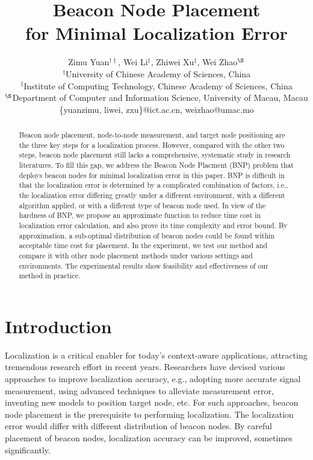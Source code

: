 \documentclass[10pt, conference, letterpaper]{IEEEtran}
\begin{document}
\title{Beacon Node Placement \\ for Minimal Localization Error}

\author{Zimu Yuan$^{\dagger\ddagger}$, Wei Li$^\ddagger$, Zhiwei Xu$^\ddagger$, Wei Zhao$^\S$ \\ $^{\dagger}$University of Chinese Academy of Sciences, China\\
$^{\ddagger}$Institute of Computing Technology, Chinese Academy of Sciences, China\\
$^\S$Department of Computer and Information Science, University of Macau, Macau\\
\{yuanzimu, liwei, zxu\}@ict.ac.cn, weizhao@umac.mo
}

\maketitle \thispagestyle{empty}

\begin{abstract}
Beacon node placement, node-to-node measurement, and target node positioning are the three key steps for a localization process. However, compared with the other two steps, beacon node placement still lacks a comprehensive, systematic study in research literatures. To fill this gap, we address the Beacon Node Placment (BNP) problem that deploys beacon nodes for minimal localization error in this paper. BNP is difficult in that the localization error is determined by a complicated combination of factors, i.e., the localization error differing greatly under a different environment, with a different algorithm applied, or with a different type of beacon node used. In view of the hardness of BNP, we propose an approximate function to reduce time cost in localization error calculation, and also prove its time complexity and error bound. By approximation, a sub-optimal distribution of beacon nodes could be found within acceptable time cost for placement. In the experiment, we test our method and compare it with other node placement methods under various settings and environments. The experimental results show feasibility and effectiveness of our method in practice.
\end{abstract}

\section{Introduction}
Localization is a critical enabler for today's context-aware applications, attracting tremendous research effort in recent years. Researchers have devised various approaches to improve localization accuracy, e.g., adopting more accurate signal measurement, using advanced techniques to alleviate measurement error, inventing new models to position target node, etc. For such approaches, beacon node placement is the prerequisite to performing localization. The localization error would differ with different distribution of beacon nodes. By careful placement of beacon nodes, localization accuracy can be improved, sometimes significantly.
\end{document}

